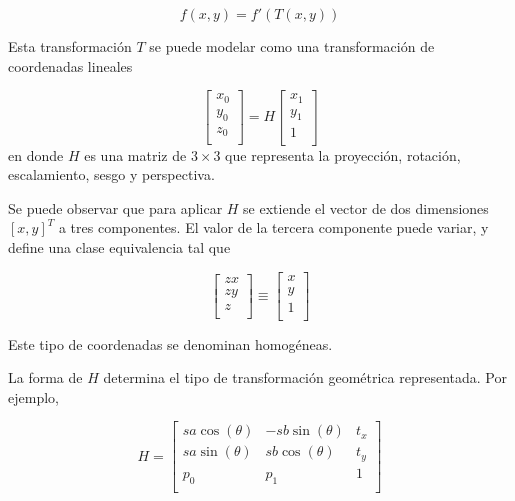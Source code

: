 \begin{equation}
    f(x,y) = f'(T(x,y))
\end{equation}

Esta transformación $T$ se puede modelar como una transformación de coordenadas lineales

\begin{equation}
    \begin{bmatrix}
        x_{0} \\
        y_{0} \\
        z_{0} \\
    \end{bmatrix}
    = H
    \begin{bmatrix}
        x_{1} \\
        y_{1} \\
        1 \\
    \end{bmatrix}
\end{equation}
en donde $H$ es una matriz de $3 \times 3$ que representa la proyección, rotación, escalamiento, sesgo y perspectiva.

Se puede observar que para aplicar $H$ se extiende el vector de dos dimensiones $[x,y]^{T}$ a tres componentes. El valor de la
tercera componente puede variar, y define una clase equivalencia tal que

\begin{equation}
    \begin{bmatrix}
        zx \\
        zy \\
        z \\
    \end{bmatrix}
    \equiv
    \begin{bmatrix}
        x \\
        y \\
        1 \\
    \end{bmatrix}
\end{equation}

Este tipo de coordenadas se denominan homogéneas.

La forma de $H$ determina el tipo de transformación geométrica representada. Por ejemplo,

\begin{equation}
    H =
    \begin{bmatrix}
        sa\cos(\theta) & -sb\sin(\theta) & t_{x}\\
        sa\sin(\theta) & sb\cos(\theta) & t_{y} \\
        p_{0}          & p_{1}          & 1     \\
    \end{bmatrix}
\end{equation}

